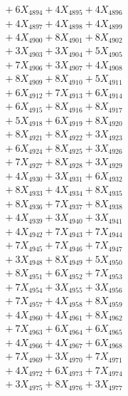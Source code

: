 \documentclass[a4paper,10pt]{article}
\begin{document}
{\begin{align}
&\;  + 6 X_{4894} + 4 X_{4895} + 4 X_{4896} \\[0.3ex]
&\;  + 4 X_{4897} + 4 X_{4898} + 4 X_{4899} \\[0.5ex]\allowbreak
&\;  + 4 X_{4900} + 8 X_{4901} + 8 X_{4902} \\[0.3ex]
&\;  + 3 X_{4903} + 3 X_{4904} + 5 X_{4905} \\[0.3ex]
&\;  + 7 X_{4906} + 3 X_{4907} + 4 X_{4908} \\[0.3ex]
&\;  + 8 X_{4909} + 8 X_{4910} + 5 X_{4911} \\[0.3ex]
&\;  + 6 X_{4912} + 7 X_{4913} + 6 X_{4914} \\[0.3ex]
&\;  + 6 X_{4915} + 8 X_{4916} + 8 X_{4917} \\[0.3ex]
&\;  + 5 X_{4918} + 6 X_{4919} + 8 X_{4920} \\[0.3ex]
&\;  + 8 X_{4921} + 8 X_{4922} + 3 X_{4923} \\[0.3ex]
&\;  + 6 X_{4924} + 8 X_{4925} + 3 X_{4926} \\[0.3ex]
&\;  + 7 X_{4927} + 8 X_{4928} + 3 X_{4929} \\[0.5ex]\allowbreak
&\;  + 4 X_{4930} + 3 X_{4931} + 6 X_{4932} \\[0.3ex]
&\;  + 8 X_{4933} + 4 X_{4934} + 8 X_{4935} \\[0.3ex]
&\;  + 8 X_{4936} + 7 X_{4937} + 8 X_{4938} \\[0.3ex]
&\;  + 4 X_{4939} + 3 X_{4940} + 3 X_{4941} \\[0.3ex]
&\;  + 4 X_{4942} + 7 X_{4943} + 7 X_{4944} \\[0.3ex]
&\;  + 7 X_{4945} + 7 X_{4946} + 7 X_{4947} \\[0.3ex]
&\;  + 3 X_{4948} + 8 X_{4949} + 5 X_{4950} \\[0.3ex]
&\;  + 8 X_{4951} + 6 X_{4952} + 7 X_{4953} \\[0.3ex]
&\;  + 7 X_{4954} + 3 X_{4955} + 3 X_{4956} \\[0.3ex]
&\;  + 7 X_{4957} + 4 X_{4958} + 8 X_{4959} \\[0.5ex]\allowbreak
&\;  + 4 X_{4960} + 4 X_{4961} + 8 X_{4962} \\[0.3ex]
&\;  + 7 X_{4963} + 6 X_{4964} + 6 X_{4965} \\[0.3ex]
&\;  + 4 X_{4966} + 4 X_{4967} + 6 X_{4968} \\[0.3ex]
&\;  + 7 X_{4969} + 3 X_{4970} + 7 X_{4971} \\[0.3ex]
&\;  + 4 X_{4972} + 6 X_{4973} + 7 X_{4974} \\[0.3ex]
&\;  + 3 X_{4975} + 8 X_{4976} + 3 X_{4977} \\[0.3ex]

\end{align}}
\end{document}
